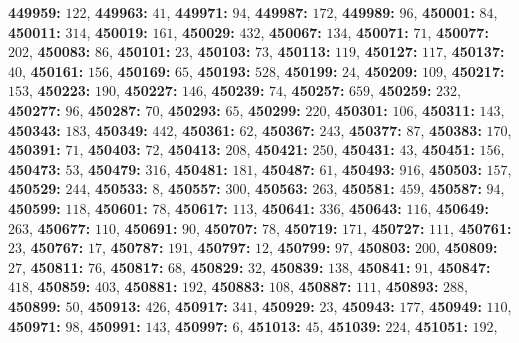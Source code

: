 \textsf{\bfseries 449959:} $122$, \textsf{\bfseries 449963:} $41$, \textsf{\bfseries 449971:} $94$, \textsf{\bfseries 449987:} $172$, \textsf{\bfseries 449989:} $96$, \textsf{\bfseries 450001:} $84$, \textsf{\bfseries 450011:} $314$, \textsf{\bfseries 450019:} $161$, \textsf{\bfseries 450029:} $432$, \textsf{\bfseries 450067:} $134$, \textsf{\bfseries 450071:} $71$, \textsf{\bfseries 450077:} $202$, \textsf{\bfseries 450083:} $86$, \textsf{\bfseries 450101:} $23$, \textsf{\bfseries 450103:} $73$, \textsf{\bfseries 450113:} $119$, \textsf{\bfseries 450127:} $117$, \textsf{\bfseries 450137:} $40$, \textsf{\bfseries 450161:} $156$, \textsf{\bfseries 450169:} $65$, \textsf{\bfseries 450193:} $528$, \textsf{\bfseries 450199:} $24$, \textsf{\bfseries 450209:} $109$, \textsf{\bfseries 450217:} $153$, \textsf{\bfseries 450223:} $190$, \textsf{\bfseries 450227:} $146$, \textsf{\bfseries 450239:} $74$, \textsf{\bfseries 450257:} $659$, \textsf{\bfseries 450259:} $232$, \textsf{\bfseries 450277:} $96$, \textsf{\bfseries 450287:} $70$, \textsf{\bfseries 450293:} $65$, \textsf{\bfseries 450299:} $220$, \textsf{\bfseries 450301:} $106$, \textsf{\bfseries 450311:} $143$, \textsf{\bfseries 450343:} $183$, \textsf{\bfseries 450349:} $442$, \textsf{\bfseries 450361:} $62$, \textsf{\bfseries 450367:} $243$, \textsf{\bfseries 450377:} $87$, \textsf{\bfseries 450383:} $170$, \textsf{\bfseries 450391:} $71$, \textsf{\bfseries 450403:} $72$, \textsf{\bfseries 450413:} $208$, \textsf{\bfseries 450421:} $250$, \textsf{\bfseries 450431:} $43$, \textsf{\bfseries 450451:} $156$, \textsf{\bfseries 450473:} $53$, \textsf{\bfseries 450479:} $316$, \textsf{\bfseries 450481:} $181$, \textsf{\bfseries 450487:} $61$, \textsf{\bfseries 450493:} $916$, \textsf{\bfseries 450503:} $157$, \textsf{\bfseries 450529:} $244$, \textsf{\bfseries 450533:} $8$, \textsf{\bfseries 450557:} $300$, \textsf{\bfseries 450563:} $263$, \textsf{\bfseries 450581:} $459$, \textsf{\bfseries 450587:} $94$, \textsf{\bfseries 450599:} $118$, \textsf{\bfseries 450601:} $78$, \textsf{\bfseries 450617:} $113$, \textsf{\bfseries 450641:} $336$, \textsf{\bfseries 450643:} $116$, \textsf{\bfseries 450649:} $263$, \textsf{\bfseries 450677:} $110$, \textsf{\bfseries 450691:} $90$, \textsf{\bfseries 450707:} $78$, \textsf{\bfseries 450719:} $171$, \textsf{\bfseries 450727:} $111$, \textsf{\bfseries 450761:} $23$, \textsf{\bfseries 450767:} $17$, \textsf{\bfseries 450787:} $191$, \textsf{\bfseries 450797:} $12$, \textsf{\bfseries 450799:} $97$, \textsf{\bfseries 450803:} $200$, \textsf{\bfseries 450809:} $27$, \textsf{\bfseries 450811:} $76$, \textsf{\bfseries 450817:} $68$, \textsf{\bfseries 450829:} $32$, \textsf{\bfseries 450839:} $138$, \textsf{\bfseries 450841:} $91$, \textsf{\bfseries 450847:} $418$, \textsf{\bfseries 450859:} $403$, \textsf{\bfseries 450881:} $192$, \textsf{\bfseries 450883:} $108$, \textsf{\bfseries 450887:} $111$, \textsf{\bfseries 450893:} $288$, \textsf{\bfseries 450899:} $50$, \textsf{\bfseries 450913:} $426$, \textsf{\bfseries 450917:} $341$, \textsf{\bfseries 450929:} $23$, \textsf{\bfseries 450943:} $177$, \textsf{\bfseries 450949:} $110$, \textsf{\bfseries 450971:} $98$, \textsf{\bfseries 450991:} $143$, \textsf{\bfseries 450997:} $6$, \textsf{\bfseries 451013:} $45$, \textsf{\bfseries 451039:} $224$, \textsf{\bfseries 451051:} $192$, 
